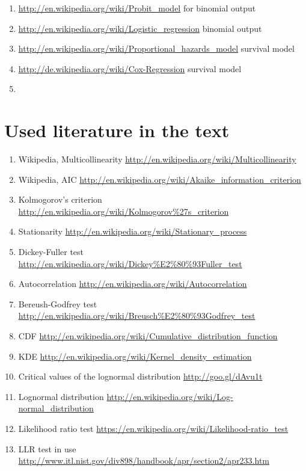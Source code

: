 \documentclass{article}
\begin{document}
\begin{enumerate}
		\begin{enumerate}
			\item \textcolor{black}{\url{http://en.wikipedia.org/wiki/Probit_model}} for binomial output
			\item \textcolor{black}{\url{http://en.wikipedia.org/wiki/Logistic_regression}}	binomial output
			\item \textcolor{black}{\url{http://en.wikipedia.org/wiki/Proportional_hazards_model}} survival model 
			\item \textcolor{black}{\url{http://de.wikipedia.org/wiki/Cox-Regression}} survival model
			\item \textcolor{black}{\url{}}
		\end{enumerate}
\end{enumerate}
\section*{Used literature in the text}
\begin{enumerate}
	\item Wikipedia, Multicollinearity \url{http://en.wikipedia.org/wiki/Multicollinearity}
	\item Wikipedia, AIC \url{http://en.wikipedia.org/wiki/Akaike_information_criterion}
	\item Kolmogorov's criterion \url{http://en.wikipedia.org/wiki/Kolmogorov\%27s_criterion}
	\item Stationarity \url{http://en.wikipedia.org/wiki/Stationary_process}
	\item Dickey-Fuller test \url{http://en.wikipedia.org/wiki/Dickey\%E2\%80\%93Fuller_test}
	\item Autocorrelation \url{http://en.wikipedia.org/wiki/Autocorrelation}
	\item Bereush-Godfrey test \url{http://en.wikipedia.org/wiki/Breusch\%E2\%80\%93Godfrey_test}
	\item CDF \url{http://en.wikipedia.org/wiki/Cumulative_distribution_function}
	\item KDE \url{http://en.wikipedia.org/wiki/Kernel_density_estimation}
	\item Critical values of the lognormal distribution \url{http://goo.gl/dAvu1t}
	\item Lognormal distribution \url{http://en.wikipedia.org/wiki/Log-normal_distribution}
	\item Likelihood ratio test \url{https://en.wikipedia.org/wiki/Likelihood-ratio_test}
	\item LLR test in use \url{http://www.itl.nist.gov/div898/handbook/apr/section2/apr233.htm}
\end{enumerate}
\end{document}
